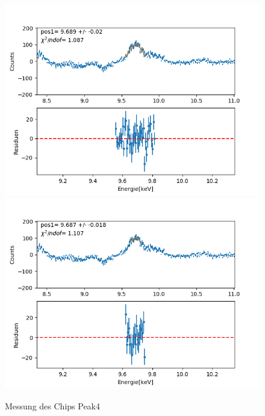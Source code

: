 \documentclass[12pt,a4paper]{article}
\begin{document}
\begin{figure}[H]
\centering
\includegraphics[scale=0.49]{Bilder/roentgen_spektren/chip/chip4_1.png}
\includegraphics[scale=0.49]{Bilder/roentgen_spektren/chip/chip4_2.png}
\caption{Messung des Chips Peak4}
\end{figure}
\end{document}

